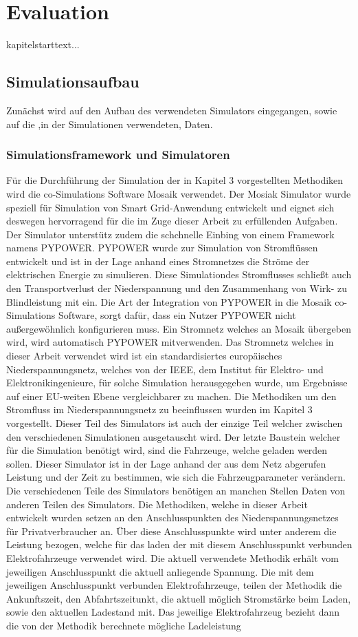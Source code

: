 \chapter{Evaluation}
kapitelstarttext...
\section{Simulationsaufbau}
Zunächst wird auf den Aufbau des verwendeten Simulators eingegangen, sowie auf die ,in der Simulationen verwendeten, Daten.
\subsection{Simulationsframework und Simulatoren}
Für die Durchführung der Simulation der in Kapitel 3 vorgestellten Methodiken wird die co-Simulations Software Mosaik verwendet. Der Mosiak Simulator wurde speziell für Simulation von Smart Grid-Anwendung entwickelt und eignet sich deswegen hervorragend für die im Zuge dieser Arbeit zu erfüllenden Aufgaben. Der Simulator unterstütz zudem die schchnelle Einbing von einem Framework namens PYPOWER. PYPOWER wurde zur Simulation von Stromflüssen entwickelt und ist in der Lage anhand eines Stromnetzes die Ströme der elektrischen Energie zu simulieren. Diese Simulationdes Stromflusses schließt auch den Transportverlust der Niederspannung und den Zusammenhang von Wirk- zu Blindleistung mit ein. Die Art der Integration von PYPOWER in die Mosaik co-Simulations Software, sorgt dafür, dass ein Nutzer PYPOWER nicht außergewöhnlich konfigurieren muss. Ein Stromnetz welches an Mosaik übergeben wird, wird automatisch PYPOWER mitverwenden. Das Stromnetz welches in dieser Arbeit verwendet wird ist ein standardisiertes europäisches Niederspannungsnetz, welches von der IEEE, dem Institut für Elektro- und Elektronikingenieure, für solche Simulation herausgegeben wurde, um Ergebnisse auf einer EU-weiten Ebene vergleichbarer zu machen. Die Methodiken um den Stromfluss im Niederspannungsnetz zu beeinflussen wurden im Kapitel 3 vorgestellt. Dieser Teil des Simulators ist auch der einzige Teil welcher zwischen den verschiedenen Simulationen ausgetauscht wird. Der letzte Baustein welcher für die Simulation benötigt wird, sind die Fahrzeuge, welche geladen werden sollen. Dieser Simulator ist in der Lage anhand der aus dem Netz abgerufen Leistung und der Zeit zu bestimmen, wie sich die Fahrzeugparameter verändern. Die verschiedenen Teile des Simulators benötigen an manchen Stellen Daten von anderen Teilen des Simulators. Die Methodiken, welche in dieser Arbeit entwickelt wurden setzen an den Anschlusspunkten des Niederspannungsnetzes für Privatverbraucher an. Über diese Anschlusspunkte wird unter anderem die Leistung bezogen, welche für das laden der mit diesem Anschlusspunkt verbunden Elektrofahrzeuge verwendet wird. Die aktuell verwendete Methodik erhält vom jeweiligen Anschlusspunkt die aktuell anliegende Spannung. Die mit dem jeweiligen Anschlusspunkt verbunden Elektrofahrzeuge, teilen der Methodik die Ankunftszeit, den Abfahrtszeitunkt, die aktuell möglich Stromstärke beim Laden, sowie den aktuellen Ladestand mit. Das jeweilige Elektrofahrzeug bezieht dann die von der Methodik berechnete mögliche Ladeleistung 
